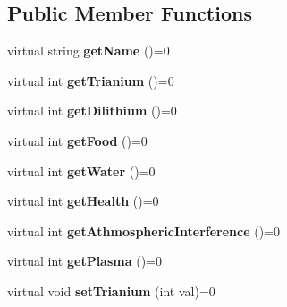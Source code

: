 \subsection*{Public Member Functions}
\begin{DoxyCompactItemize}
\item 
\hypertarget{classCelestialBody_adc6fec6a37c5ca24cd3c960e234d459b}{
virtual string {\bfseries getName} ()=0}
\label{d4/d0b/classCelestialBody_adc6fec6a37c5ca24cd3c960e234d459b}

\item 
\hypertarget{classCelestialBody_a0d582688d7873dd1ab37deea6d9e6f75}{
virtual int {\bfseries getTrianium} ()=0}
\label{d4/d0b/classCelestialBody_a0d582688d7873dd1ab37deea6d9e6f75}

\item 
\hypertarget{classCelestialBody_a91905e3d314dcb8546fefe5afe608ecf}{
virtual int {\bfseries getDilithium} ()=0}
\label{d4/d0b/classCelestialBody_a91905e3d314dcb8546fefe5afe608ecf}

\item 
\hypertarget{classCelestialBody_a9fb597600b74df80c8db04db4245b51f}{
virtual int {\bfseries getFood} ()=0}
\label{d4/d0b/classCelestialBody_a9fb597600b74df80c8db04db4245b51f}

\item 
\hypertarget{classCelestialBody_adf2ba9c0831a125d023513cc25639142}{
virtual int {\bfseries getWater} ()=0}
\label{d4/d0b/classCelestialBody_adf2ba9c0831a125d023513cc25639142}

\item 
\hypertarget{classCelestialBody_aae61fa7b39d4c23d1b831058bac186a0}{
virtual int {\bfseries getHealth} ()=0}
\label{d4/d0b/classCelestialBody_aae61fa7b39d4c23d1b831058bac186a0}

\item 
\hypertarget{classCelestialBody_a702fdc8427e6823fae9f3b10e77e59a7}{
virtual int {\bfseries getAthmosphericInterference} ()=0}
\label{d4/d0b/classCelestialBody_a702fdc8427e6823fae9f3b10e77e59a7}

\item 
\hypertarget{classCelestialBody_a19a84a9719569f12f74cc44174e27b67}{
virtual int {\bfseries getPlasma} ()=0}
\label{d4/d0b/classCelestialBody_a19a84a9719569f12f74cc44174e27b67}

\item 
\hypertarget{classCelestialBody_ab6797f9d41fefe5c77c7e08b32ec6787}{
virtual void {\bfseries setTrianium} (int val)=0}
\label{d4/d0b/classCelestialBody_ab6797f9d41fefe5c77c7e08b32ec6787}


\end{DoxyCompactItemize}
